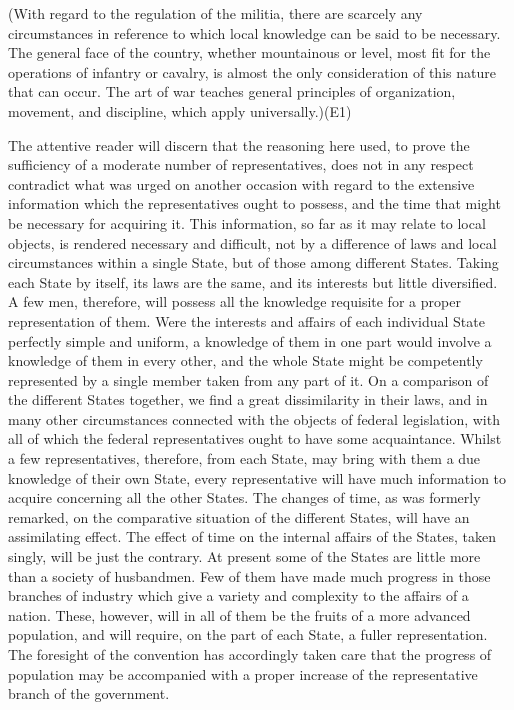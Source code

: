 (With regard to the regulation of the militia, there are scarcely any circumstances in reference to which local knowledge can be said to be necessary. 
The general face of the country, whether mountainous or level, most fit for the operations of infantry or cavalry, is almost the only consideration of this nature that can occur. 
The art of war teaches general principles of organization, movement, and discipline, which apply universally.)(E1)

The attentive reader will discern that the reasoning here used, to prove the sufficiency of a moderate number of representatives, does not in any respect contradict what was urged on another occasion with regard to the extensive information which the representatives ought to possess, and the time that might be necessary for acquiring it. 
This information, so far as it may relate to local objects, is rendered necessary and difficult, not by a difference of laws and local circumstances within a single State, but of those among different States. 
Taking each State by itself, its laws are the same, and its interests but little diversified. 
A few men, therefore, will possess all the knowledge requisite for a proper representation of them. 
Were the interests and affairs of each individual State perfectly simple and uniform, a knowledge of them in one part would involve a knowledge of them in every other, and the whole State might be competently represented by a single member taken from any part of it. 
On a comparison of the different States together, we find a great dissimilarity in their laws, and in many other circumstances connected with the objects of federal legislation, with all of which the federal representatives ought to have some acquaintance. 
Whilst a few representatives, therefore, from each State, may bring with them a due knowledge of their own State, every representative will have much information to acquire concerning all the other States. 
The changes of time, as was formerly remarked, on the comparative situation of the different States, will have an assimilating effect. 
The effect of time on the internal affairs of the States, taken singly, will be just the contrary. 
At present some of the States are little more than a society of husbandmen. 
Few of them have made much progress in those branches of industry which give a variety and complexity to the affairs of a nation. 
These, however, will in all of them be the fruits of a more advanced population, and will require, on the part of each State, a fuller representation. 
The foresight of the convention has accordingly taken care that the progress of population may be accompanied with a proper increase of the representative branch of the government.

